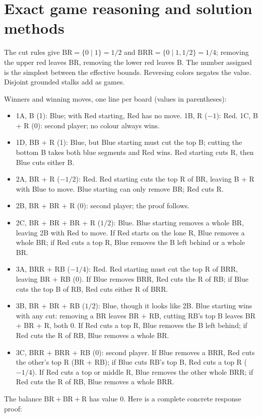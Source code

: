 \documentclass[11pt,letterpaper]{article}
\begin{document}
\section*{Exact game reasoning and solution methods}
The cut rules give $\mathrm{BR}=\{0\mid1\}=1/2$ and $\mathrm{BRR}=\{0\mid1,1/2\}=1/4$; removing the upper red leaves BR, removing the lower red leaves B. The number assigned is the simplest between the effective bounds. Reversing colors negates the value. Disjoint grounded stalks add as games.

Winners and winning moves, one line per board (values in parentheses):
\begin{itemize}
\item 1A, B (1): Blue; with Red starting, Red has no move. 1B, R ($-1$): Red. 1C, B + R (0): second player; no colour always wins.
\item 1D, BB + R (1): Blue, but Blue starting must cut the top B; cutting the bottom B takes both blue segments and Red wins. Red starting cuts R, then Blue cuts either B.
\item 2A, BR + R ($-1/2$): Red. Red starting cuts the top R of BR, leaving B + R with Blue to move. Blue starting can only remove BR; Red cuts R.
\item 2B, BR + BR + R (0): second player; the proof follows.
\item 2C, BR + BR + BR + R ($1/2$): Blue. Blue starting removes a whole BR, leaving 2B with Red to move. If Red starts on the lone R, Blue removes a whole BR; if Red cuts a top R, Blue removes the B left behind or a whole BR.
\item 3A, BRR + RB ($-1/4$): Red. Red starting must cut the top R of BRR, leaving BR + RB (0). If Blue removes BRR, Red cuts the R of RB; if Blue cuts the top B of RB, Red cuts either R of BRR.
\item 3B, BR + BR + RB ($1/2$): Blue, though it looks like 2B. Blue starting wins with any cut: removing a BR leaves BR + RB, cutting RB's top B leaves BR + BR + R, both 0. If Red cuts a top R, Blue removes the B left behind; if Red cuts the R of RB, Blue removes a whole BR.
\item 3C, BRR + BRR + RB (0): second player. If Blue removes a BRR, Red cuts the other's top R (BR + RB); if Blue cuts RB's top B, Red cuts a top R ($-1/4$). If Red cuts a top or middle R, Blue removes the other whole BRR; if Red cuts the R of RB, Blue removes a whole BRR.
\end{itemize}
The balance $\mathrm{BR}+\mathrm{BR}+\mathrm{R}$ has value 0. Here is a complete concrete response proof:
\end{document}
